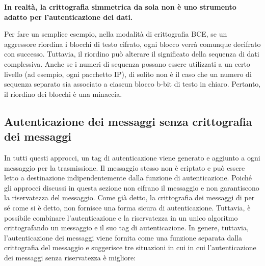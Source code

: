 \singlespacing

\textbf{In realtà, la crittografia simmetrica da sola non è uno strumento adatto per l'autenticazione dei dati.}

\singlespacing

Per fare un semplice esempio, nella modalità di crittografia BCE, se un aggressore riordina i blocchi di testo cifrato, ogni blocco verrà comunque decifrato con successo. Tuttavia, il riordino può alterare il significato della sequenza di dati complessiva. Anche se i numeri di sequenza possano essere utilizzati a un certo livello (ad esempio, ogni pacchetto IP), di solito non è il caso che un numero di sequenza separato sia associato a ciascun blocco b-bit di testo in chiaro.
Pertanto, il riordino dei blocchi è una minaccia.

\subsection{Autenticazione dei messaggi senza crittografia dei messaggi}
In tutti questi approcci, un tag di autenticazione viene generato e aggiunto a ogni messaggio per la trasmissione. Il messaggio stesso non è criptato e può essere letto a destinazione indipendentemente dalla funzione di autenticazione. Poiché gli approcci discussi in questa sezione non cifrano il messaggio e non garantiscono la riservatezza del messaggio. Come già detto, la crittografia dei messaggi di per sé come si è detto, non fornisce una forma sicura di autenticazione. Tuttavia, è possibile combinare l'autenticazione e la riservatezza in un unico algoritmo crittografando un messaggio e il suo tag di autenticazione. In genere, tuttavia, l'autenticazione dei messaggi viene fornita come una funzione separata dalla crittografia del messaggio e suggerisce tre situazioni in cui in cui l'autenticazione dei messaggi senza riservatezza è migliore:

